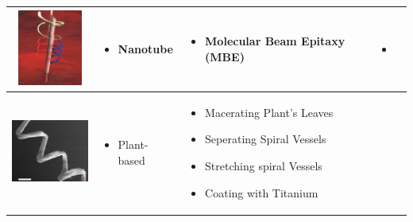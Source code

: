 \documentclass[a4paper,11pt]{article}
\begin{document}
\begin{sloppypar}
\begin{table}[h!]
\begin{tabular}{ c  m{3cm}  m{4.3cm} m{3cm} }
 \begin{minipage}{.3\textwidth}
      \includegraphics[width=\linewidth, height=25mm]{tube_ta}
    \end{minipage}
    &
      \begin{itemize}
        \item Nanotube
        
      \end{itemize}
    & 
      \begin{itemize}
        \item Molecular Beam Epitaxy (MBE)
	   
	   
    
      \end{itemize}
	&
	   \begin{itemize}
        \item \citep{C2NR32798H}
   
      \end{itemize}
    \\ \hline


 \begin{minipage}{.3\textwidth}
      \includegraphics[width=\linewidth, height=25mm]{plant_ta}
    \end{minipage}
    &
      \begin{itemize}
        \item Plant-based
      
      \end{itemize}
    & 
      \begin{itemize}
        \item Macerating Plant\rq{}s Leaves
	\item Seperating Spiral Vessels
	\item Stretching spiral Vessels
	\item Coating with Titanium


\end{itemize}
\end{tabular}
\end{table}
\end{sloppypar}
\end{document}
